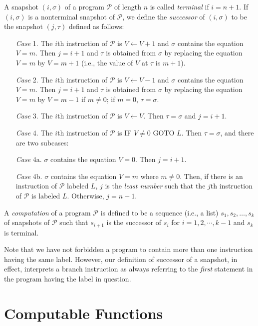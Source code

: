 \documentclass[12pt,a4paper,twoside,openany]{book}
\begin{document}
A snapshot $(i,\sigma)$ of a program $\mathscr{P}$ of length $n$ is called \textit{terminal} if $i=n+1$. If $(i,\sigma)$ is a nonterminal snapshot of $\mathscr{P}$, we define the \textit{successor} of $(i,\sigma)$ to be the snapshot $(j,\tau)$ defined as follows:
\begin{itemize}
    \item[\textit{Case} 1.] The $i$th instruction of $\mathscr{P}$ is $V\leftarrow V+1$ and $\sigma$ contains the equation $V=m$. Then $j=i+1$ and $\tau$ is obtained from $\sigma$ by replacing the equation $V=m$ by $V=m+1$ (i.e., the value of $V$ at $\tau$ is $m+1$).
    \item[\textit{Case} 2.] The $i$th instruction of $\mathscr{P}$ is $V\leftarrow V-1$ and $\sigma$ contains the equation $V=m$. Then $j=i+1$ and $\tau$ is obtained from $\sigma$ by replacing the equation $V=m$ by $V=m-1$ if $m\neq 0$; if $m=0$, $\tau=\sigma$.
    \item[\textit{Case} 3.] The $i$th instruction of $\mathscr{P}$ is $V\leftarrow V$. Then $\tau=\sigma$ and $j=i+1$.
    \item[\textit{Case} 4.] The $i$th instruction of $\mathscr{P}$ is IF $V\neq 0$ GOTO $L$. Then $\tau=\sigma$, and there are two subcases:
    \item[\textit{Case} 4a.] $\sigma$ contains the equation $V=0$. Then $j=i+1$.
    \item[\textit{Case} 4b.] $\sigma$ contains the equation $V=m$ where $m\neq 0$. Then, if there is an instruction of $\mathscr{P}$ labeled $L$, $j$ is the \textit{least number} such that the $j$th instruction of $\mathscr{P}$ is labeled $L$. Otherwise, $j=n+1$.
\end{itemize}

A \textit{computation} of a program $\mathscr{P}$ is defined to be a sequence (i.e., a list) $s_1,s_2,\ldots,s_k$ of snapshots of $\mathscr{P}$ such that $s_{i+1}$ is the successor of $s_i$ for $i=1,2,\cdots,k-1$ and $s_k$ is terminal.

Note that we have not forbidden a program to contain more than one instruction having the same label. However, our definition of successor of a snapshot, in effect, interprets a branch instruction as always referring to the \textit{first} statement in the program having the label in question.

\section{Computable Functions}
\end{document}
